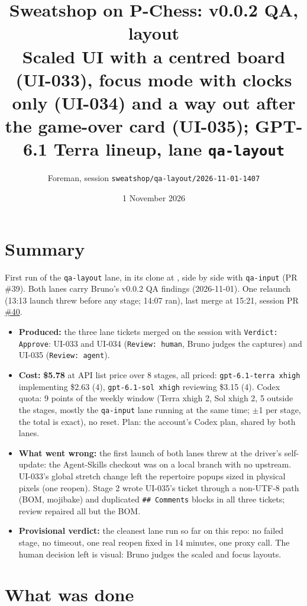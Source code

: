 \documentclass[11pt,a4paper]{article}
\title{Sweatshop on P-Chess: v0.0.2 QA, layout\\\large Scaled UI with a centred board (UI-033), focus mode with clocks only (UI-034) and a way out after the game-over card (UI-035); GPT-6.1 Terra lineup, lane \texttt{qa-layout}}
\author{Foreman, session \texttt{sweatshop/qa-layout/2026-11-01-1407}}
\date{1 November 2026}
\begin{document}
\maketitle

\section*{Summary}

First run of the \texttt{qa-layout} lane, in its clone at ,
side by side with \texttt{qa-input} (PR \#39). Both lanes carry Bruno's v0.0.2 QA findings
(2026-11-01). One relaunch (13:13 launch threw before any stage; 14:07 ran), last merge at 15:21,
session PR \href{https://github.com/Laginho/P-Chess/pull/40}{\#40}.

\begin{itemize}
  \item \textbf{Produced:} the three lane tickets merged on the session with
        \texttt{Verdict: Approve}: UI-033 and UI-034 (\texttt{Review: human}, Bruno judges the
        captures) and UI-035 (\texttt{Review: agent}).
  \item \textbf{Cost:} \textbf{\$5.78} at API list price over 8 stages, all priced:
        \texttt{gpt-6.1-terra xhigh} implementing \$2.63 (4), \texttt{gpt-6.1-sol xhigh} reviewing
        \$3.15 (4). Codex quota: 9 points of the weekly window (Terra xhigh 2, Sol xhigh 2, 5
        outside the stages, mostly the \texttt{qa-input} lane running at the same time; $\pm$1 per
        stage, the total is exact), no reset. Plan: the account's Codex plan, shared by both lanes.
  \item \textbf{What went wrong:} the first launch of both lanes threw at the driver's self-update:
        the Agent-Skills checkout was on a local branch with no upstream. UI-033's global stretch
        change left the repertoire popups sized in physical pixels (one reopen). Stage 2 wrote
        UI-035's ticket through a non-UTF-8 path (BOM, mojibake) and duplicated
        \texttt{\#\# Comments} blocks in all three tickets; review repaired all but the BOM.
  \item \textbf{Provisional verdict:} the cleanest lane run so far on this repo: no failed stage,
        no timeout, one real reopen fixed in 14 minutes, one proxy call. The human decision left is
        visual: Bruno judges the scaled and focus layouts.
\end{itemize}

\section*{What was done}
\end{document}
